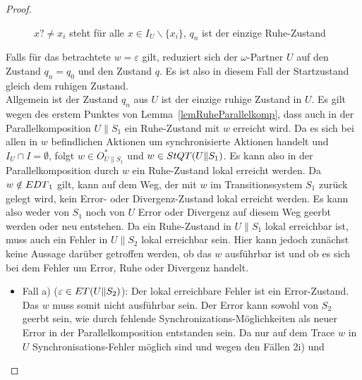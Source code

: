 \begin{proof}
\begin{figure} [h!tbp]
\begin{center}
    \caption{$x?\neq x_i$ steht für alle $x\in I_U\backslash\{x_i\}$, $q_n$
      ist der einzige Ruhe-Zustand}
\label{UohneEmitIundO}
  \end{center}
  \end{figure}
  Falls für das betrachtete $w =\varepsilon$ gilt, reduziert sich der
  $\omega$-Partner $U$ auf den Zustand $q_n =q_0$ und den Zustand $q$. Es ist
  also in diesem Fall der Startzustand gleich dem ruhigen Zustand.\\
  Allgemein ist der Zustand $q_n$ aus $U$ ist der einzige ruhige Zustand in $U$.
  Es gilt wegen des erstem Punktes von Lemma~\ref{lemRuheParallelkomp}, dass
  auch in der Parallelkomposition $U\|S_1$ ein Ruhe-Zustand mit $w$ erreicht
  wird. Da es sich bei allen in $w$ befindlichen Aktionen um synchronisierte
  Aktionen handelt und $I_U\cap I=\emptyset$, folgt $w\in O_{U\|S_1}^*$ und
  $w\in StQT{}(U\|S_1)$. Es kann also in der Parallelkomposition durch $w$
  ein Ruhe-Zustand lokal erreicht werden. Da $w\notin EDT{}_1$ gilt, kann
  auf dem Weg, der mit $w$ im Transitionssystem $S_1$ zurück gelegt wird,
  kein Error- oder Divergenz-Zustand lokal erreicht werden. Es kann also
  weder von $S_1$ noch von $U$ Error oder Divergenz auf diesem Weg geerbt
  werden oder neu entstehen. Da ein Ruhe-Zustand in $U\|S_1$ lokal
  erreichbar ist, muss auch ein Fehler in $U\|S_2$ lokal erreichbar sein.
  Hier kann jedoch zunächst keine Aussage darüber getroffen werden, ob das
  $w$ ausführbar ist und ob es sich bei dem Fehler um Error, Ruhe oder
  Divergenz handelt.
  \begin{itemize}
    \item Fall a) ($\varepsilon\in ET{}(U\|S_2)$): Der lokal erreichbare
      Fehler ist ein Error-Zustand. Das $w$ muss somit nicht ausführbar sein. Der
      Error kann sowohl von $S_2$ geerbt sein, wie durch fehlende
      Synchronizations-Möglichkeiten als neuer Error in der
      Parallelkomposition entstanden sein. Da nur auf dem Trace $w$ in $U$
      Synchronisations-Fehler möglich sind und wegen den Fällen 2i) und

\end{itemize}
\end{proof}
